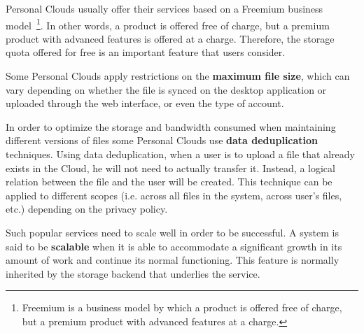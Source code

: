 Personal Clouds usually offer their services based on a Freemium business model~\footnote{Freemium is a business model by which a product is offered free of charge, but a premium product with advanced features at a charge.}. In other words, a product is offered free of charge, but a premium product with advanced features is offered at a charge. Therefore, the storage quota offered for free is an important feature that users consider.

Some Personal Clouds apply restrictions on the \textbf{maximum file size}, which can vary depending on whether the file is synced on the desktop application or uploaded through the web interface, or even the type of account.

In order to optimize the storage and bandwidth consumed when maintaining different versions of files some Personal Clouds use \textbf{data deduplication} techniques. Using data deduplication, when a user is to upload a file that already exists in the Cloud, he will not need to actually transfer it. Instead, a logical relation between the file and the user will be created. This technique can be applied to different scopes (i.e. across all files in the system, across user's files, etc.) depending on the privacy policy.

Such popular services need to scale well in order to be successful. A system is said to be \textbf{scalable} when it is able to accommodate a significant growth in its amount of work and continue its normal functioning. This feature is normally inherited by the storage backend that underlies the service.




